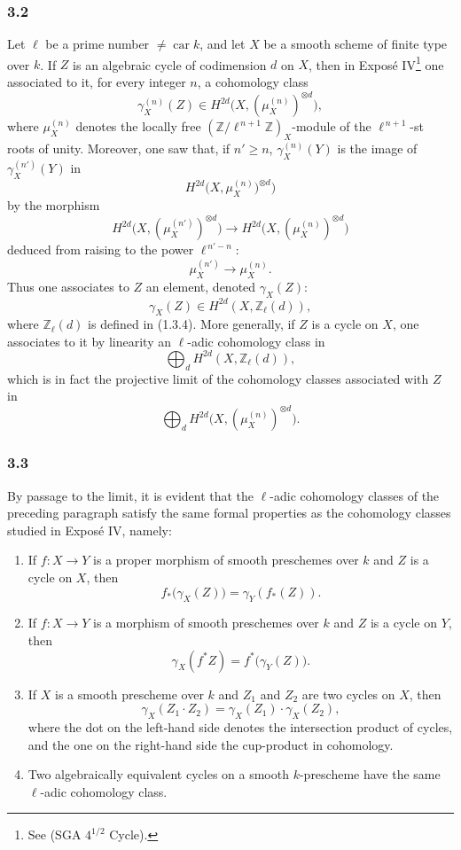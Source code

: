 \documentclass[11pt]{article}
\providecommand{\car}{\operatorname{car}}
\providecommand{\car}{\operatorname{car}}
\providecommand{\car}{\operatorname{car}}
\begin{document}
\subsubsection*{3.2}
Let \(\ell\) be a prime number \(\ne\car k\), and let \(X\) be a smooth scheme of finite type over \(k\). If \(Z\) is an algebraic cycle of codimension \(d\) on \(X\), then in Exposé IV\footnote{See (SGA \(4^{1/2}\) Cycle).} one associated to it, for every integer \(n\), a cohomology class
\[
\gamma_X^{(n)}(Z)\in H^{2d}\bigl(X,(\mu_X^{(n)})^{\otimes d}\bigr),
\]
where \(\mu_X^{(n)}\) denotes the locally free \((\mathbb Z/\ell^{\,n+1}\mathbb Z)_X\)-module of the \(\ell^{\,n+1}\)-st roots of unity. Moreover, one saw that, if \(n'\ge n\), \(\gamma_X^{(n)}(Y)\) is the image of \(\gamma_X^{(n')}(Y)\) in
\[
H^{2d}\bigl(X,\mu_X^{(n)})^{\otimes d}\bigr)
\]
by the morphism
\[
H^{2d}\bigl(X,(\mu_X^{(n')})^{\otimes d}\bigr)
\longrightarrow
H^{2d}\bigl(X,(\mu_X^{(n)})^{\otimes d}\bigr)
\]
deduced from raising to the power \(\ell^{\,n'-n}\):
\[
\mu_X^{(n')}\longrightarrow \mu_X^{(n)}.
\]
Thus one associates to \(Z\) an element, denoted \(\gamma_X(Z)\):
\[
\gamma_X(Z)\in H^{2d}(X,\mathbb Z_\ell(d)),
\]
where \(\mathbb Z_\ell(d)\) is defined in (1.3.4). More generally, if \(Z\) is a cycle on \(X\), one associates to it by linearity an \(\ell\)-adic cohomology class in
\[
\bigoplus_d H^{2d}(X,\mathbb Z_\ell(d)),
\]
which is in fact the projective limit of the cohomology classes associated with \(Z\) in
\[
\bigoplus_d H^{2d}\bigl(X,(\mu_X^{(n)})^{\otimes d}\bigr).
\]

\subsubsection*{3.3}
By passage to the limit, it is evident that the \(\ell\)-adic cohomology classes of the preceding paragraph satisfy the same formal properties as the cohomology classes studied in Exposé IV, namely:

\begin{enumerate}[label=(\roman*)]
\item If \(f:X\to Y\) is a proper morphism of smooth preschemes over \(k\) and \(Z\) is a cycle on \(X\), then
\[
f_*\bigl(\gamma_X(Z)\bigr)=\gamma_Y(f_*(Z)).
\tag{*}
\]

\item If \(f:X\to Y\) is a morphism of smooth preschemes over \(k\) and \(Z\) is a cycle on \(Y\), then
\[
\gamma_X(f^*Z)=f^*\bigl(\gamma_Y(Z)\bigr).
\tag{**}
\]

\item If \(X\) is a smooth prescheme over \(k\) and \(Z_1\) and \(Z_2\) are two cycles on \(X\), then
\[
\gamma_X(Z_1\cdot Z_2)=\gamma_X(Z_1)\cdot \gamma_X(Z_2),
\tag{**}
\]
where the dot on the left-hand side denotes the intersection product of cycles, and the one on the right-hand side the cup-product in cohomology.

\item Two algebraically equivalent cycles on a smooth \(k\)-prescheme have the same \(\ell\)-adic cohomology class.
\end{enumerate}
\end{document}
